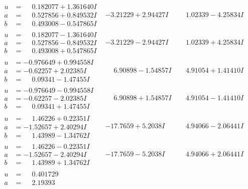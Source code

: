 \documentclass[1p]{elsarticle_modified}
\theoremstyle{definition}
\begin{document}
$$\begin{array}{c|c|c}
\begin{aligned}
u &= \phantom{-}0.182077 + 1.361640 I \\
a &= \phantom{-}0.527856 + 0.849532 I \\
b &= \phantom{-}0.493008 - 0.547865 I\end{aligned}
 & -3.21229 + 2.94427 I & \phantom{-}1.02339 - 4.25834 I \\ \hline\begin{aligned}
u &= \phantom{-}0.182077 - 1.361640 I \\
a &= \phantom{-}0.527856 - 0.849532 I \\
b &= \phantom{-}0.493008 + 0.547865 I\end{aligned}
 & -3.21229 - 2.94427 I & \phantom{-}1.02339 + 4.25834 I \\ \hline\begin{aligned}
u &= -0.976649 + 0.994558 I \\
a &= -0.62257 + 2.02385 I \\
b &= \phantom{-}0.09341 - 1.47455 I\end{aligned}
 & \phantom{-}6.90898 - 1.54857 I & \phantom{-}4.91054 + 1.41410 I \\ \hline\begin{aligned}
u &= -0.976649 - 0.994558 I \\
a &= -0.62257 - 2.02385 I \\
b &= \phantom{-}0.09341 + 1.47455 I\end{aligned}
 & \phantom{-}6.90898 + 1.54857 I & \phantom{-}4.91054 - 1.41410 I \\ \hline\begin{aligned}
u &= \phantom{-}1.46226 + 0.22351 I \\
a &= -1.52657 + 2.40294 I \\
b &= \phantom{-}1.43989 - 1.34762 I\end{aligned}
 & -17.7659 + 5.2038 I & \phantom{-}4.94066 - 2.06441 I \\ \hline\begin{aligned}
u &= \phantom{-}1.46226 - 0.22351 I \\
a &= -1.52657 - 2.40294 I \\
b &= \phantom{-}1.43989 + 1.34762 I\end{aligned}
 & -17.7659 - 5.2038 I & \phantom{-}4.94066 + 2.06441 I \\ \hline\begin{aligned}
u &= \phantom{-}0.401729\phantom{ +0.000000I} \\
a &= \phantom{-}2.19393\phantom{ +0.000000I} \\

\end{aligned}
\end{array}$$
\end{document}
